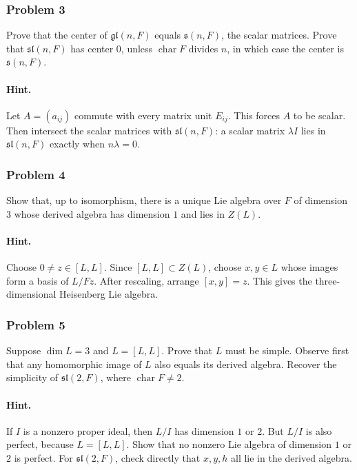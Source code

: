 \documentclass[12pt, a4paper]{article}
\begin{document}
\subsubsection{Problem 3}

Prove that the center of \(\mathfrak{gl}(n,F)\) equals \(\mathfrak{s}(n,F)\),
the scalar matrices. Prove that \(\mathfrak{sl}(n,F)\) has center \(0\), unless
\(\operatorname{char} F\) divides \(n\), in which case the center is
\(\mathfrak{s}(n,F)\).

\paragraph{Hint.}
Let \(A=(a_{ij})\) commute with every matrix unit \(E_{ij}\). This forces
\(A\) to be scalar. Then intersect the scalar matrices with
\(\mathfrak{sl}(n,F)\): a scalar matrix \(\lambda I\) lies in
\(\mathfrak{sl}(n,F)\) exactly when \(n\lambda=0\).

\subsubsection{Problem 4}

Show that, up to isomorphism, there is a unique Lie algebra over \(F\) of
dimension \(3\) whose derived algebra has dimension \(1\) and lies in \(Z(L)\).

\paragraph{Hint.}
Choose \(0 \neq z \in [L,L]\). Since \([L,L]\subset Z(L)\), choose
\(x,y\in L\) whose images form a basis of \(L/Fz\). After rescaling, arrange
\([x,y]=z\). This gives the three-dimensional Heisenberg Lie algebra.

\subsubsection{Problem 5}

Suppose \(\dim L=3\) and \(L=[L,L]\). Prove that \(L\) must be simple. Observe
first that any homomorphic image of \(L\) also equals its derived algebra.
Recover the simplicity of \(\mathfrak{sl}(2,F)\), where
\(\operatorname{char} F \neq 2\).

\paragraph{Hint.}
If \(I\) is a nonzero proper ideal, then \(L/I\) has dimension \(1\) or \(2\).
But \(L/I\) is also perfect, because \(L=[L,L]\). Show that no nonzero Lie
algebra of dimension \(1\) or \(2\) is perfect. For
\(\mathfrak{sl}(2,F)\), check directly that \(x,y,h\) all lie in the derived
algebra.
\end{document}
